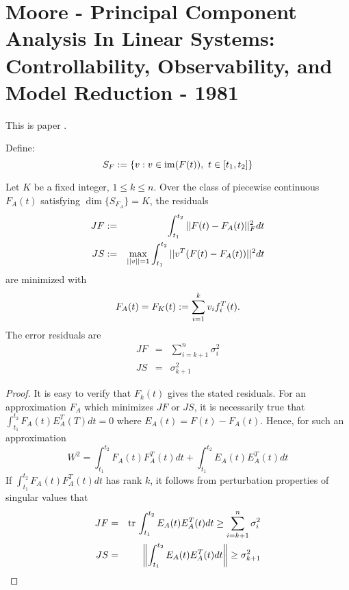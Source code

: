\section{Moore - Principal Component Analysis In Linear Systems: Controllability, Observability, and Model Reduction - 1981}
\label{App:PaperNotes:MoorePCA1981}

This is paper \cite{Moore1981}.


\begin{proposition}[Proposition 4]
Define:
\[
S_F:= \left\{v:v\in {\rm im}(F(t)),\ t\in[t_1,t_2]\right\}
\]

Let $K$ be a fixed integer, $1\leq k \leq n$.  Over the class of piecewise continuous $F_A(t)$ satisfying $\dim\{S_{F_A}\}=K$, the residuals 
\begin{eqnarray}
JF&:= &\int_{t_1}^{t_2} ||F(t)-F_A(t)||_F^2 dt\\
JS&:= &\max_{||v||=1} \int_{t_1}^{t_2} ||v^T(F(t)-F_A(t))||^2 dt
\end{eqnarray}
are minimized with 
\begin{equation}
F_A(t)=F_K(t):= \sum_{i=1}^k v_i f_i^T(t).
\end{equation}
The error residuals are 
\begin{eqnarray}
JF&=&\sum_{i=k+1}^n \sigma_i^2\\
JS&=&\sigma_{k+1}^2
\end{eqnarray}
\end{proposition}

\begin{proof}
It is easy to verify that $F_k(t)$ gives the stated residuals.  For an approximation $F_A$ which minimizes $JF$ or $JS$, it is necessarily true that $\int_{t_1}^{t_2}F_A(t)E_A^T(T)dt=0$ where $E_A(t)=F(t)-F_A(t)$.  Hence, for such an approximation 
\begin{equation}
W^2=\int_{t_1}^{t_2}F_A(t)F_A^T(t) dt+\int_{t_1}^{t_2}E_A(t)E_A^T(t)dt
\end{equation}
If $\int_{t_1}^{t_2}F_A(t)F_A^T(t) dt$ has rank $k$, it follows from perturbation properties of singular values that 
\begin{eqnarray}
JF&=& {\rm tr}\,\int_{t_1}^{t_2}E_A(t)E_A^T(t)dt\geq \sum_{i=k+1}^n \sigma_i^2\\
JS&=&\left\|\int_{t_1}^{t_2}E_A(t)E_A^T(t)dt\right\|\geq \sigma_{k+1}^2
\end{eqnarray}
\end{proof}





